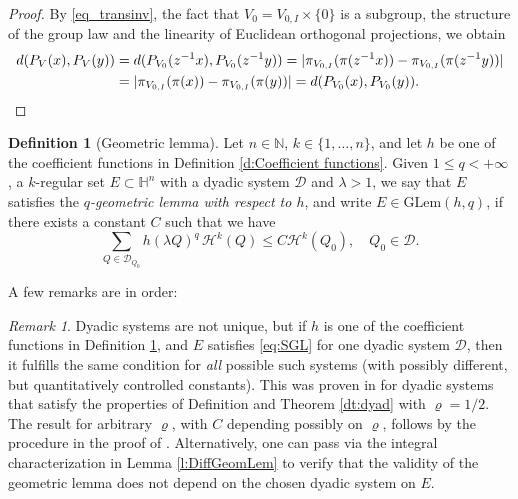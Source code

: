 \documentclass[12pt]{amsart}
\numberwithin{equation}{section}
\theoremstyle{plain}
\theoremstyle{definition}
\newtheorem{definition}[theorem]{Definition}
\theoremstyle{remark}
\newtheorem{remark}[theorem]{Remark}
\begin{document}
\begin{proof}
   By \eqref{eq_transinv}, the fact that $V_0=V_{0,I}\times \{0\}$ is a subgroup, the structure of the group law and the linearity of Euclidean orthogonal projections, we obtain
  \[\begin{split}d(P_V(x),P_V(y))&=d(P_{V_0}(z^{-1}x),P_{V_0}(z^{-1}y))=|\pi_{V_{0,I}}(\pi(z^{-1}x))-\pi_{V_{0,I}}(\pi(z^{-1}y))|\\ &=|\pi_{V_{0,I}}(\pi(x))-\pi_{V_{0,I}}(\pi(y))|=d(P_{V_0}(x), P_{V_0}(y)).\qedhere\end{split}\]
\end{proof}

\begin{definition}[Geometric lemma]\label{d:GL}
Let $n\in \mathbb{N}$, $k\in \{1,\ldots,n\}$, and let $h$ be one of the coefficient functions in Definition \ref{d:Coefficient functions}.
Given $1\leq q<+\infty$, a $k$-regular set $E\subset \mathbb{H}^n$ with a dyadic system $\mathcal{D}$ %
and $\lambda >1$, we say that $E$ satisfies the
\emph{$q$-geometric lemma with respect to $h$}, and  write
$E\in\mathrm{GLem}(h,q)$, if there exists a constant $C$ such that
we have
\begin{equation}\label{eq:SGL}
\sum_{Q\in \mathcal{D}_{Q_0}} h(\lambda Q)^q\, \mathcal{H}^k(Q) \leq C \mathcal{H}^k(Q_0), \quad
Q_0\in \mathcal{D}.
\end{equation}
\end{definition}

A few remarks are in order:
\begin{remark}\label{r:IndepDyadSyst}
 Dyadic systems are not unique, but if $h$ is one of the coefficient functions in Definition \ref{d:GL}, and $E$ satisfies \eqref{eq:SGL} for one dyadic system $\mathcal{D}$, then it fulfills the same condition for \emph{all} possible such systems (with possibly different, but quantitatively controlled constants). This was proven in \cite[Remark 2.16]{FV1} for dyadic systems that satisfy the properties of Definition and Theorem \ref{dt:dyad} with $\varrho=1/2$. 
 The result for arbitrary $\varrho$, with $C$ depending 
possibly on $\varrho$, follows by the procedure in the proof of \cite[Proposition 2.12]{MR3589162}. Alternatively, one can pass via the integral characterization in Lemma \ref{l:DiffGeomLem} to verify that the  validity of the geometric lemma does not depend on the chosen dyadic system on $E$. 
 \end{remark}
\end{document}

